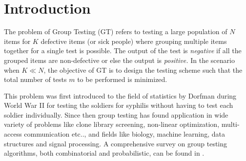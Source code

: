 

\section{Introduction}
The problem of Group Testing (GT) refers to testing a large population of $N$ items for $K$ defective items (or sick people) where grouping multiple items together for a single test is possible. The output of the test is \textit{negative} if all the grouped items are non-defective or else the output is \textit{positive.} In the scenario when $K \ll N$, the objective of GT is to design the testing scheme such that the total number of tests $m$ to be performed is minimized.

This problem was first introduced to the field of statistics by Dorfman \cite{dorfman1943detection} during World War II for testing the soldiers for syphilis without having to test each soldier individually. Since then group testing has found application in wide variety of problems like clone library screening, non-linear optimization, multi-access communication etc.., \cite{du1999combinatorial} and fields like biology\cite{chen2008survey}, machine learning\cite{malioutov2013exact}, data structures\cite{goodrich2005indexing} and signal processing\cite{emad2014poisson}. A comprehensive survey on group testing algorithms, both combinatorial and probabilistic, can be found in \cite{du1999combinatorial,chan2014non,atia2012boolean}. 


